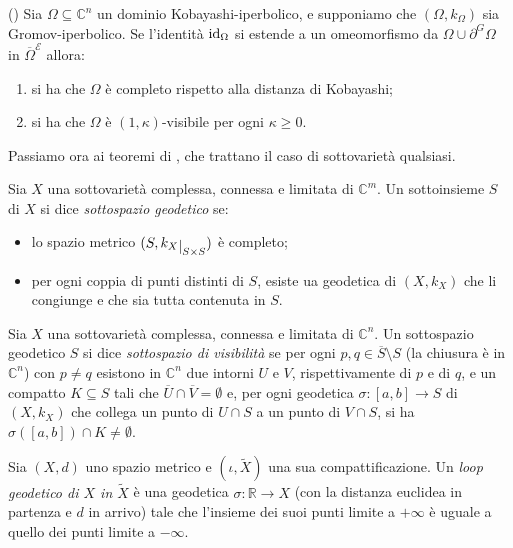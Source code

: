 \begin{thm}
    (\cite[Theorem 1.10]{BZ2}) Sia $\Omega\subseteq\mathbb{C}^n$ un dominio Kobayashi-iperbolico, e supponiamo che $(\Omega,k_\Omega)$ sia Gromov-iperbolico. Se l'identità $\operatorname{id}_\Omega$ si estende a un omeomorfismo da $\Omega\cup\partial^G\Omega$ in $\overline{\Omega}^\mathcal{E}$ allora:
    \begin{enumerate}[label={(\arabic*)}]
        \item si ha che $\Omega$ è completo rispetto alla distanza di Kobayashi;
        \item si ha che $\Omega$ è $(1,\kappa)$-visibile per ogni $\kappa\ge0$.
    \end{enumerate}
\end{thm}

Passiamo ora ai teoremi di \cite{CMS}, che trattano il caso di sottovarietà qualsiasi.

\begin{defn}
    Sia $X$ una sottovarietà complessa, connessa e limitata di $\mathbb{C}^m$. Un sottoinsieme $S$ di $X$ si dice \textit{sottospazio geodetico} se:
    \begin{itemize}
        \item lo spazio metrico $(S,k_X\restrict{S\times S})$ è completo;
        \item per ogni coppia di punti distinti di $S$, esiste ua geodetica di $(X,k_X)$ che li congiunge e che sia tutta contenuta in $S$.
    \end{itemize}
\end{defn}

\begin{defn}
    Sia $X$ una sottovarietà complessa, connessa e limitata di $\mathbb{C}^n$. Un sottospazio geodetico $S$ si dice \textit{sottospazio di visibilità} se per ogni $p,q\in\overline{S}\setminus S$ (la chiusura è in $\mathbb{C}^n$) con $p\not=q$ esistono in $\mathbb{C}^n$ due intorni $U$ e $V$, rispettivamente di $p$ e di $q$, e un compatto $K\subseteq S$ tali che $\overline{U}\cap\overline{V}=\emptyset$ e, per ogni geodetica $\sigma:[a,b]\longrightarrow S$ di $(X,k_X)$ che collega un punto di $U\cap S$ a un punto di $V\cap S$, si ha $\sigma([a,b])\cap K\not=\emptyset$.
\end{defn}

\begin{defn}
    Sia $(X,d)$ uno spazio metrico e $(\iota,\tilde{X})$ una sua compattificazione. Un \textit{loop geodetico di $X$ in $\tilde{X}$} è una geodetica $\sigma:\mathbb{R}\longrightarrow X$ (con la distanza euclidea in partenza e $d$ in arrivo) tale che l'insieme dei suoi punti limite a $+\infty$ è uguale a quello dei punti limite a $-\infty$.
\end{defn}

